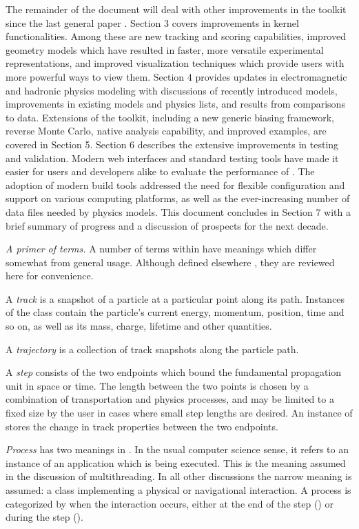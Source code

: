 The remainder of the document will deal with other improvements in the toolkit
since the last \Gfour{} general paper \cite{bib:generalpaper2}.
Section 3 covers improvements in kernel functionalities.  Among these are
new tracking and scoring capabilities, improved geometry models which have 
resulted in faster, more versatile experimental representations, and improved 
visualization techniques which provide users with more powerful ways to view 
them.  Section 4 provides updates in electromagnetic and hadronic physics 
modeling with discussions of recently introduced models, improvements in 
existing models and physics lists, and results from comparisons to data.
Extensions of the toolkit, including a new generic biasing framework, reverse
Monte Carlo, native analysis capability, and improved examples, are covered 
in Section 5.  Section 6 describes the extensive improvements in testing and
validation.  Modern web interfaces and standard testing tools have made it 
easier for users and developers alike to evaluate the performance of \Gfour{}.
The adoption of modern build tools addressed the need for flexible 
configuration and support on various computing platforms, as well as the 
ever-increasing number of data files needed by physics models.
This document concludes in Section 7 with a brief summary of \Gfour{} progress
and a discussion of prospects for the next decade.

\textit{A primer of terms.}
A number of terms within \Gfour{} have meanings which differ somewhat from 
general usage.  Although defined elsewhere \cite{bib:generalpaper2}, they are
reviewed here for convenience.

A \textit{track} is a snapshot of a particle at a particular point along its
path.  Instances of the class  contain the particle's current
energy, momentum, position, time and so on, as well as its mass, charge,
lifetime and other quantities.

A \textit{trajectory} is a collection of track snapshots along the particle
path.

A \textit{step} consists of the two endpoints which bound the fundamental
propagation unit in space or time.  The length between the two points is chosen
by a combination of transportation and physics processes, and may be limited
to a fixed size by the user in cases where small step lengths are desired.  An
instance of  stores the change in track properties between the 
two endpoints.

\textit{Process} has two meanings in \Gfour{}.  In the usual computer science 
sense, it refers to an instance of an application which is being executed.  This
is the meaning assumed in the discussion of multithreading.  In all 
other discussions the narrow \Gfour{} meaning is assumed: a class implementing a
physical or navigational interaction.  A \Gfour{} process is categorized by when 
the interaction occurs, either at the end of the step () or 
during the step ().

